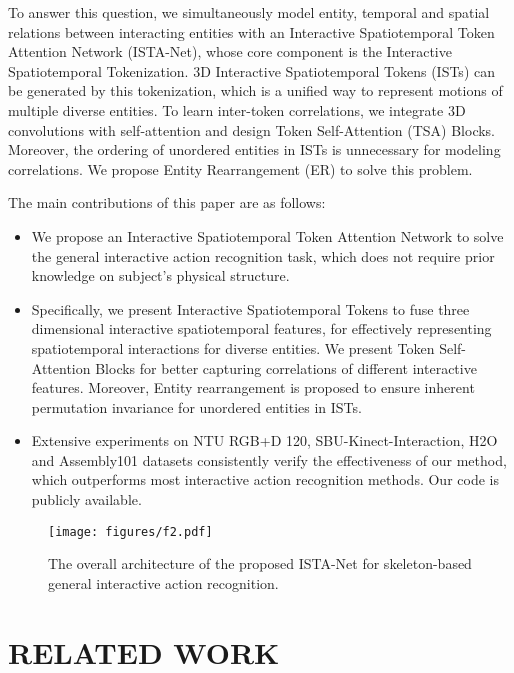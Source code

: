 \documentclass[letterpaper, 10 pt, conference]{ieeeconf}
\begin{document}
To answer this question, we simultaneously model entity, temporal and spatial relations between interacting entities with an Interactive Spatiotemporal Token Attention Network (ISTA-Net), whose core component is the Interactive Spatiotemporal Tokenization. 3D Interactive Spatiotemporal Tokens (ISTs) can be generated by this tokenization, which is a unified way to represent motions of multiple diverse entities. To learn inter-token correlations, we integrate 3D convolutions with self-attention and design Token Self-Attention (TSA) Blocks. Moreover, the ordering of unordered entities in ISTs is unnecessary for modeling correlations. We propose Entity Rearrangement (ER) to solve this problem.

The main contributions of this paper are as follows:
\begin{itemize}
\item{We propose an Interactive Spatiotemporal Token Attention Network to solve the general interactive action recognition task, which does not require prior knowledge on subject's physical structure.}
\item{Specifically, we present Interactive Spatiotemporal Tokens to fuse three dimensional interactive spatiotemporal features, for effectively representing spatiotemporal interactions for diverse entities. We present Token Self-Attention Blocks for better capturing correlations of different interactive features. Moreover, Entity rearrangement is proposed to ensure inherent permutation invariance for unordered entities in ISTs.}
\item{Extensive experiments on NTU RGB+D 120, SBU-Kinect-Interaction, H2O and Assembly101 datasets consistently verify the effectiveness of our method, which outperforms most interactive action recognition methods. Our code is publicly available.}
\end{itemize}

\begin{figure*}[t]
    \begin{center}
    \texttt{[image: figures/f2.pdf]}   
    \end{center}
    \vspace{-1.2em}
    \caption{The overall architecture of the proposed ISTA-Net for skeleton-based general interactive action recognition.}
    \label{method}
    \vspace{-1.2em}
\end{figure*}

\section{RELATED WORK}
\end{document}
